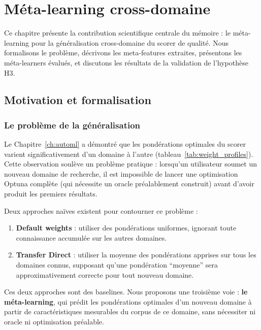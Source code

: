 \chapter{Méta-learning cross-domaine}
\label{ch:metalearning}

Ce chapitre présente la contribution scientifique centrale du mémoire :
le méta-learning pour la généralisation cross-domaine du scorer de qualité.
Nous formalisons le problème, décrivons les meta-features extraites,
présentons les méta-learners évalués, et discutons les résultats de la
validation de l'hypothèse H3.

\section{Motivation et formalisation}
\label{sec:meta_motivation}

\subsection{Le problème de la généralisation}

Le Chapitre~\ref{ch:automl} a démontré que les pondérations optimales
du scorer varient significativement d'un domaine à l'autre (tableau~\ref{tab:weight_profiles}).
Cette observation soulève un problème pratique : lorsqu'un utilisateur
soumet un nouveau domaine de recherche, il est impossible de lancer une
optimisation Optuna complète (qui nécessite un oracle préalablement construit)
avant d'avoir produit les premiers résultats.

Deux approches naïves existent pour contourner ce problème :
\begin{enumerate}
  \item \textbf{Default weights} : utiliser des pondérations uniformes,
    ignorant toute connaissance accumulée sur les autres domaines.
  \item \textbf{Transfer Direct} : utiliser la moyenne des pondérations
    apprises sur tous les domaines connus, supposant qu'une pondération
    ``moyenne'' sera approximativement correcte pour tout nouveau domaine.
\end{enumerate}

Ces deux approches sont des baselines. Nous proposons une troisième voie :
\textbf{le méta-learning}, qui prédit les pondérations optimales d'un nouveau
domaine à partir de caractéristiques mesurables du corpus de ce domaine,
sans nécessiter ni oracle ni optimisation préalable.

